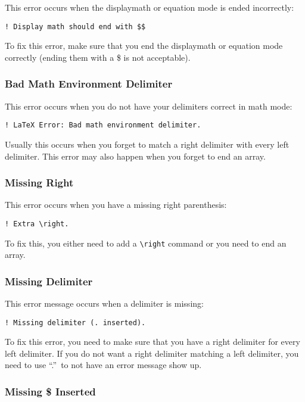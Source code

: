 This error occurs when the displaymath or equation mode is ended incorrectly:
\begin{verbatim}
! Display math should end with $$
\end{verbatim}

To fix this error, make sure that you end the displaymath or equation
mode correctly (ending them with a \$ is not acceptable).

\subsubsection{Bad Math Environment Delimiter}
\label{sec:bad-math-environment}

This error occurs when you do not have your delimiters correct in math
mode:
\begin{verbatim}
! LaTeX Error: Bad math environment delimiter.
\end{verbatim}

Usually this occurs when you forget to match a right delimiter with
every left delimiter.  This error may also happen when you forget to
end an array.

\subsubsection{Missing Right}
\label{sec:missing-right}

This error occurs when you have a missing right parenthesis:
\begin{verbatim}
! Extra \right.
\end{verbatim}

To fix this, you either need to add a \verb|\right| command or you
need to end an array.

\subsubsection{Missing Delimiter}
\label{sec:missing-delimiter}

This error message occurs when a delimiter is missing:
\begin{verbatim}
! Missing delimiter (. inserted).
\end{verbatim}

To fix this error, you need to make sure that you have a right
delimiter for every left delimiter.  If you do not want a right
delimiter matching a left delimiter, you need to use ``.''\ to not
have an error message show up.

\subsubsection{Missing \$ Inserted}
\label{sec:missing--inserted}

